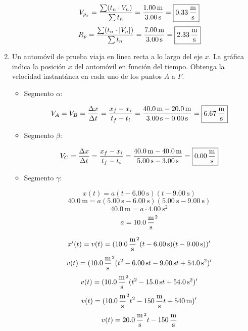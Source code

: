 \documentclass[Análisis.root.tex]{subfiles}
\begin{document}
\begin{enumerate}
\begin{enumerate}
                \[
                  V_{p_x}
                  =\frac{\sum(t_n\cdot V_n)}{\sum t_n}
                  =\frac{\SI{1,00}{\meter}}{\SI{3,00}{\second}}
                  =\boxed{\SI{0,33}{\meter\over\second}}
                \]
                \[
                  R_p
                  =\frac{\sum(t_n\cdot |V_n|)}{\sum t_n}
                  =\frac{\SI{7,00}{\meter}}{\SI{3,00}{\second}}
                  =\boxed{\SI{2,33}{\meter\over\second}}
                \]
        \end{enumerate}

  \item Un automóvil de prueba viaja en linea recta a lo largo del eje $x$. La gráfica indica la posición $x$ del automóvil en función del tiempo. Obtenga la velocidad instantánea en cada uno de los puntos $A$ a $F$.

        \begin{itemize}
          \item Segmento $\alpha$:

                \[
                  V_A=V_B
                  =\frac{\Delta x}{\Delta t}
                  =\frac{x_f-x_i}{t_f-t_i}
                  =\frac{\SI{40,0}{\meter}-\SI{20,0}{\meter}}{\SI{3,00}{\second}-\SI{0,00}{\second}}
                  =\boxed{\SI{6,67}{\meter\over\second}}
                \]

          \item Segmento $\beta$:

                \[
                  V_C
                  =\frac{\Delta x}{\Delta t}
                  =\frac{x_f-x_i}{t_f-t_i}
                  =\frac{\SI{40,0}{\meter}-\SI{40,0}{\meter}}{\SI{5,00}{\second}-\SI{3,00}{\second}}
                  =\boxed{\SI{0,00}{\meter\over\second}}
                \]

          \item Segmento $\gamma$:

                \begin{multicols}{2}
                  \[x(t)=a(t-\SI{6,00}{\second})(t-\SI{9,00}{\second})\]
                  \[\SI{40,0}{\meter}=a(\SI{5,00}{\second}-\SI{6,00}{\second})(\SI{5,00}{\second}-\SI{9,00}{\second})\]
                  \[\SI{40,0}{\meter}=a\cdot\SI{4,00}{\second\squared}\]
                  \[a=\SI{10,0}{\meter\over\second\squared}\]

                  \[x'(t)=v(t)=(\SI{10,0}{\meter\over\second\squared}(t-\SI{6,00}{\second})(t-\SI{9,00}{\second}))'\]
                  \[v(t)=(\SI{10,0}{\meter\over\second\squared}(t^2-\SI{6,00}{\second}t-\SI{9,00}{\second}t+\SI{54,0}{\second\squared})'\]
                  \[v(t)=(\SI{10,0}{\meter\over\second\squared}(t^2-\SI{15,0}{\second}t+\SI{54,0}{\second\squared})'\]
                  \[v(t)=(\SI{10,0}{\meter\over\second\squared}t^2-\SI{150}{\meter\over\second}t+\SI{540}{\meter})'\]
                  \[v(t)=\SI{20,0}{\meter\over\second\squared}t-\SI{150}{\meter\over\second}\]


\end{multicols}
\end{itemize}
\end{enumerate}
\end{document}
